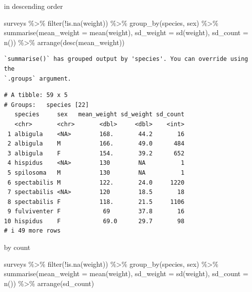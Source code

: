 \documentclass[
  letterpaper,
  DIV=11,
  numbers=noendperiod]{scrreprt}
\newenvironment{Shaded}{\begin{snugshade}}{\end{snugshade}}
\newcommand{\AttributeTok}[1]{\textcolor[rgb]{0.40,0.45,0.13}{#1}}
\newcommand{\FunctionTok}[1]{\textcolor[rgb]{0.28,0.35,0.67}{#1}}
\newcommand{\NormalTok}[1]{\textcolor[rgb]{0.00,0.23,0.31}{#1}}
\newcommand{\SpecialCharTok}[1]{\textcolor[rgb]{0.37,0.37,0.37}{#1}}
\begin{document}
in descending order

\begin{Shaded}
\begin{Highlighting}[]
\NormalTok{surveys }\SpecialCharTok{\%\textgreater{}\%}
  \FunctionTok{filter}\NormalTok{(}\SpecialCharTok{!}\FunctionTok{is.na}\NormalTok{(weight)) }\SpecialCharTok{\%\textgreater{}\%}
  \FunctionTok{group\_by}\NormalTok{(species, sex) }\SpecialCharTok{\%\textgreater{}\%}
  \FunctionTok{summarise}\NormalTok{(}\AttributeTok{mean\_weight =} \FunctionTok{mean}\NormalTok{(weight), }\AttributeTok{sd\_weight =} \FunctionTok{sd}\NormalTok{(weight), }\AttributeTok{sd\_count =} \FunctionTok{n}\NormalTok{()) }\SpecialCharTok{\%\textgreater{}\%}
  \FunctionTok{arrange}\NormalTok{(}\FunctionTok{desc}\NormalTok{(mean\_weight))}
\end{Highlighting}
\end{Shaded}

\begin{verbatim}
`summarise()` has grouped output by 'species'. You can override using the
`.groups` argument.
\end{verbatim}

\begin{verbatim}
# A tibble: 59 x 5
# Groups:   species [22]
   species     sex   mean_weight sd_weight sd_count
   <chr>       <chr>       <dbl>     <dbl>    <int>
 1 albigula    <NA>        168.       44.2       16
 2 albigula    M           166.       49.0      484
 3 albigula    F           154.       39.2      652
 4 hispidus    <NA>        130        NA          1
 5 spilosoma   M           130        NA          1
 6 spectabilis M           122.       24.0     1220
 7 spectabilis <NA>        120        18.5       18
 8 spectabilis F           118.       21.5     1106
 9 fulviventer F            69        37.8       16
10 hispidus    F            69.0      29.7       98
# i 49 more rows
\end{verbatim}

by count

\begin{Shaded}
\begin{Highlighting}[]
\NormalTok{surveys }\SpecialCharTok{\%\textgreater{}\%}
  \FunctionTok{filter}\NormalTok{(}\SpecialCharTok{!}\FunctionTok{is.na}\NormalTok{(weight)) }\SpecialCharTok{\%\textgreater{}\%}
  \FunctionTok{group\_by}\NormalTok{(species, sex) }\SpecialCharTok{\%\textgreater{}\%}
  \FunctionTok{summarise}\NormalTok{(}\AttributeTok{mean\_weight =} \FunctionTok{mean}\NormalTok{(weight), }\AttributeTok{sd\_weight =} \FunctionTok{sd}\NormalTok{(weight), }\AttributeTok{sd\_count =} \FunctionTok{n}\NormalTok{()) }\SpecialCharTok{\%\textgreater{}\%}
  \FunctionTok{arrange}\NormalTok{(sd\_count)}
\end{Highlighting}
\end{Shaded}
\end{document}
